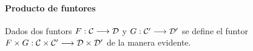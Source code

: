 \paragraph{Producto de funtores}
Dados dos funtors $F : \arr{\C}{\D}$ y $G: \arr{\C'}{\D'}$
se define el funtor $F\times G: \arr{\C\times\C'}{\D\times\D'}$ de
la manera evidente.








